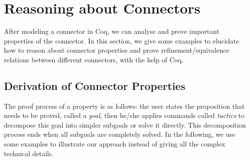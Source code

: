 \documentclass{llncs}
\begin{document}
\section{Reasoning about Connectors}\label{sec:verification}
After modeling a connector in Coq, we can analyse and prove important properties of the connector. In this section, we give some examples to elucidate how to
reason about connector properties and prove refinement/equivalence relations between different connectors, with the help of Coq.


\subsection{Derivation of Connector Properties}
The proof process of a property is as follows: the user states the proposition that needs to be proved, called a \emph{goal},
then he/she applies commands called \emph{tactics} to decompose this goal into simpler subgoals or solve it directly. This decomposition
process ends when all subgoals are completely solved. In the following, we use some examples to illustrate our approach instead of
giving all the complex technical details.
\end{document}

